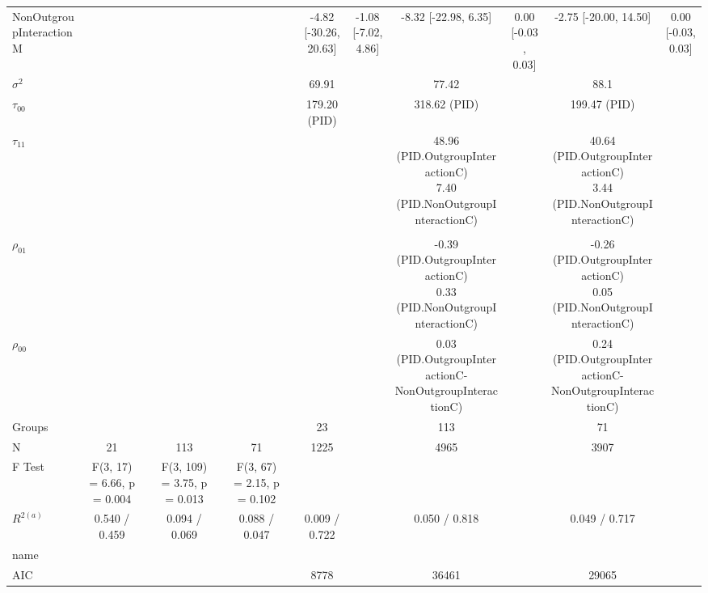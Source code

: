 \begin{landscape}
\begin{table}
\begin{minipage}[t][\textheight][t]{\textwidth}
{\begin{tabular}[t]{lcccccccccccc}
\hspace{1em}NonOutgroupInteractionM &  &  &  &  &  &  & -4.82 [-30.26, 20.63] & -1.08 [-7.02, 4.86] & -8.32 [-22.98,  6.35] & 0.00 [-0.03, 0.03] & -2.75 [-20.00, 14.50] & 0.00 [-0.03, 0.03]\\
\hspace{1em}$\sigma^2$ &  &  &  &  &  &  & 69.91 &  & 77.42 &  & 88.1 & \\
\hspace{1em}$\tau_{00}$ &  &  &  &  &  &  & 179.20 (PID) &  & 318.62 (PID) &  & 199.47 (PID) & \\
\hspace{1em}$\tau_{11}$ &  &  &  &  &  &  &  &  & \makecell[c]{48.96 (PID.OutgroupInteractionC)\\ 7.40 (PID.NonOutgroupInteractionC)} &  & \makecell[c]{40.64 (PID.OutgroupInteractionC)\\ 3.44 (PID.NonOutgroupInteractionC)} & \\
\addlinespace[0.3em]
\multicolumn{13}{l}{\textbf{Fit}}\\
\hspace{1em}$\rho_{01}$ &  &  &  &  &  &  &  &  & \makecell[c]{-0.39 (PID.OutgroupInteractionC)\\ 0.33 (PID.NonOutgroupInteractionC)} &  & \makecell[c]{-0.26 (PID.OutgroupInteractionC)\\ 0.05 (PID.NonOutgroupInteractionC)} & \\
\hspace{1em}$\rho_{00}$ &  &  &  &  &  &  &  &  & 0.03 (PID.OutgroupInteractionC-NonOutgroupInteractionC) &  & 0.24 (PID.OutgroupInteractionC-NonOutgroupInteractionC) & \\
\hspace{1em}Groups &  &  &  &  &  &  & 23 &  & 113 &  & 71 & \\
\hspace{1em}N & 21 &  & 113 &  & 71 &  & 1225 &  & 4965 &  & 3907 & \\
\hspace{1em}F Test & F(3, 17) = 6.66, p =  0.004 &  & F(3, 109) = 3.75, p =  0.013 &  & F(3, 67) = 2.15, p =  0.102 &  &  &  &  &  &  & \\
\hspace{1em}$R^{2 (a)}$ & 0.540 / 0.459 &  & 0.094 / 0.069 &  & 0.088 / 0.047 &  & 0.009 / 0.722 &  & 0.050 / 0.818 &  & 0.049 / 0.717 & \\
\hspace{1em}name &  &  &  &  &  &  &  &  &  &  &  & \\
AIC &  &  &  &  &  &  & 8778 &  & 36461 &  & 29065 & \\

\end{tabular}}
\end{minipage}
\end{table}
\end{landscape}
